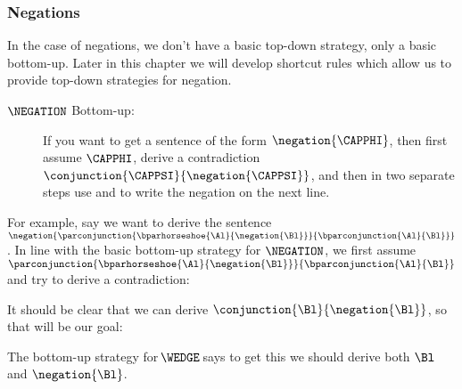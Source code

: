 \subsubsection*{Negations}
In the case of negations, we don't have a basic top-down strategy, only a basic bottom-up.  Later in this chapter we will develop shortcut rules which allow us to provide top-down strategies for negation.
\begin{description}
\item[$\NEGATION$ Bottom-up:] If you want to get a sentence of the form $\negation{\CAPPHI}$, then first assume $\CAPPHI$, derive a contradiction $\conjunction{\CAPPSI}{\negation{\CAPPSI}}$, and then in two separate steps use  and  to write the negation on the next line.
\end{description}
For example, say we want to derive the sentence $\negation{\parconjunction{\bparhorseshoe{\Al}{\negation{\Bl}}}{\bparconjunction{\Al}{\Bl}}}$. In line with the basic bottom-up strategy for $\NEGATION$, we first assume $\parconjunction{\bparhorseshoe{\Al}{\negation{\Bl}}}{\bparconjunction{\Al}{\Bl}}$ and try to derive a contradiction:
\begin{gproof}
\galineNCnd{}{}{}
\galineNCnd{}{$\qquad\vdots$}{}
\galineNCnd{}{}{}
\end{gproof}
\noindent{}It should be clear that we can derive $\conjunction{\Bl}{\negation{\Bl}}$, so that will be our goal:
\begin{gproof}
\galineNCnd{}{}{}
\galineNCnd{}{$\qquad\vdots$}{}
\galineNCnd{}{}{}
\end{gproof}
The bottom-up strategy for $\!\WEDGE\!$ says to get this we should derive both $\Bl$ and $\negation{\Bl}$.
\begin{gproof}
\galineNCnd{}{}{}
\galineNCnd{}{$\qquad\vdots$}{}
\galineNCnd{}{}{}
\end{gproof}

